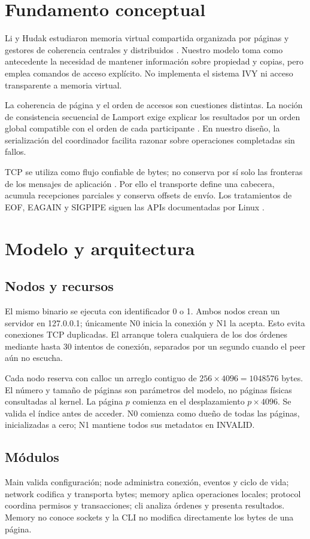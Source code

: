 \documentclass[conference]{IEEEtran}
\begin{document}
\section{Fundamento conceptual}
Li y Hudak estudiaron memoria virtual compartida organizada por páginas y gestores de
coherencia centrales y distribuidos \cite{li}. Nuestro modelo toma como antecedente la
necesidad de mantener información sobre propiedad y copias, pero emplea comandos de
acceso explícito. No implementa el sistema IVY ni acceso transparente a memoria virtual.

La coherencia de página y el orden de accesos son cuestiones distintas. La noción de
consistencia secuencial de Lamport exige explicar los resultados por un orden global
compatible con el orden de cada participante \cite{lamport}. En nuestro diseño, la
serialización del coordinador facilita razonar sobre operaciones completadas sin fallos.

TCP se utiliza como flujo confiable de bytes; no conserva por sí solo las fronteras
de los mensajes de aplicación \cite{tcp}. Por ello el transporte define una cabecera,
acumula recepciones parciales y conserva offsets de envío. Los tratamientos de EOF,
EAGAIN y SIGPIPE siguen las APIs documentadas por Linux \cite{recv,send,poll}.

\section{Modelo y arquitectura}
\subsection{Nodos y recursos}
El mismo binario se ejecuta con identificador 0 o 1. Ambos nodos crean un servidor en
127.0.0.1; únicamente N0 inicia la conexión y N1 la acepta. Esto evita conexiones
TCP duplicadas. El arranque tolera cualquiera de los dos órdenes mediante hasta 30
intentos de conexión, separados por un segundo cuando el peer aún no escucha.

Cada nodo reserva con calloc un arreglo contiguo de $256\times4096=1048576$ bytes.
El número y tamaño de páginas son parámetros del modelo, no páginas físicas consultadas
al kernel. La página $p$ comienza en el desplazamiento $p\times4096$. Se valida el
índice antes de acceder. N0 comienza como dueño de todas las páginas, inicializadas a
cero; N1 mantiene todos sus metadatos en INVALID.

\subsection{Módulos}
Main valida configuración; node administra conexión, eventos y ciclo de vida;
network codifica y transporta bytes; memory aplica operaciones locales; protocol
coordina permisos y transacciones; cli analiza órdenes y presenta resultados.
Memory no conoce sockets y la CLI no modifica directamente los bytes de una página.
\end{document}
